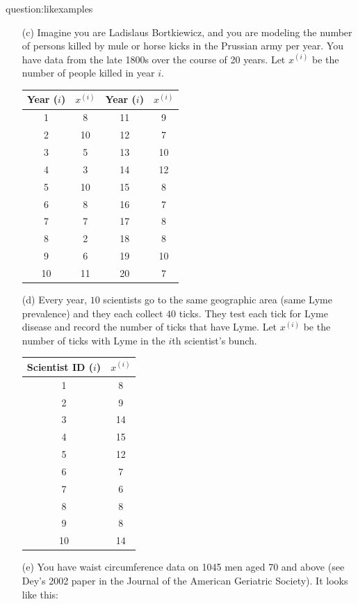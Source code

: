 \begin{question}{question:likexamples}
\begin{enumerate}
    \item[(c)] Imagine you are Ladislaus Bortkiewicz, and you are modeling the number of persons killed by mule or horse kicks in the Prussian army per year. You have data from the late 1800s over the course of 20 years. Let $x^{(i)}$ be the number of people killed in year $i$.
        
\begin{center}{\small
\begin{tabular}{cc|cc}
\toprule
Year ($i$) & $x^{(i)}$ & Year ($i$) & $x^{(i)}$ \\
\midrule
1 & 8 & 11 & 9 \\
2 & 10 & 12 & 7 \\
3 & 5 & 13 & 10 \\
4 & 3 & 14 & 12 \\
5 & 10 & 15 & 8 \\
6 & 8 & 16 & 7 \\
7 & 7 & 17 & 8 \\
8 & 2 & 18 & 8 \\
9 & 6 & 19 & 10 \\
10 & 11 & 20 & 7 \\
\end{tabular}}
\end{center}
    
    \item[(d)] Every year, $10$ scientists go to the same geographic area (same Lyme prevalence) and they each collect $40$ ticks. They test each tick for Lyme disease and record the number of ticks that have Lyme. Let $x^{(i)}$ be the number of ticks with Lyme in the $i$th scientist's bunch.
        
\begin{center}{\small
\begin{tabular}{cc}
\toprule
Scientist ID ($i$) & $x^{(i)}$ \\
\midrule
1 & 8 \\
2 & 9 \\
3 & 14 \\
4 & 15 \\
5 & 12 \\
6 & 7 \\
7 & 6 \\
8 & 8 \\
9 & 8 \\
10 & 14 \\
\end{tabular}}
\end{center}
    
    \item[(e)] You have waist circumference data on 1045 men aged 70 and above (see Dey's 2002 paper in the Journal of the American Geriatric Society). It looks like this:
    

\end{enumerate}
\end{question}
